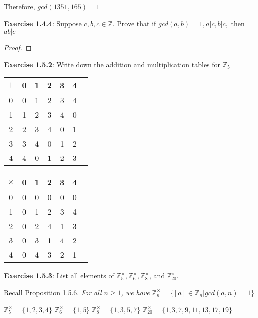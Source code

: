 \documentclass[a4paper]{article}
\begin{document}
\begin{myparindent}{0pt}
Therefore, $gcd(1351, 165) = 1$ \newline
\newline

\textbf{Exercise 1.4.4}:
Suppose $a, b, c \in \mathbb{Z}$. Prove that if $gcd(a, b) = 1, a|c, b|c,$ then $ab|c$
\begin{proof}
\end{proof}

\textbf{Exercise 1.5.2}:
Write down the addition and multiplication tables for $\mathbb{Z}_5$ \newline

\begin{center}
\begin{tabular}{ c| c | c | c | c | c | c |}
$+$ & 0 & 1 & 2 & 3 & 4 \\
\hline
0 & 0 & 1 & 2 & 3 & 4 \\
\hline
1 & 1 & 2 & 3 & 4 & 0 \\
\hline
2 & 2 & 3 & 4 & 0 & 1 \\
\hline
3 & 3 & 4 & 0 & 1 & 2 \\
\hline
4 & 4 & 0 & 1 & 2 & 3 \\
\hline
\end{tabular}
\end{center}

\begin{center}
\begin{tabular}{ c| c | c | c | c | c | c |}
$\times$ & 0 & 1 & 2 & 3 & 4 \\
\hline
0 & 0 & 0 & 0 & 0 & 0 \\
\hline
1 & 0 & 1 & 2 & 3 & 4 \\
\hline
2 & 0 & 2 & 4 & 1 & 3 \\
\hline
3 & 0 & 3 & 1 & 4 & 2 \\
\hline
4 & 0 & 4 & 3 & 2 & 1 \\
\hline
\end{tabular}
\end{center}

\textbf{Exercise 1.5.3}:
List all elements of $\mathbb{Z}_5^\times, \mathbb{Z}_6^\times, \mathbb{Z}_8^\times$, and $\mathbb{Z}_{20}^\times$.
\newline

Recall Proposition 1.5.6. \textit{For all $n \ge 1$, we have} $\mathbb{Z}_n^\times = \{ [a] \in \mathbb{Z}_n | gcd(a, n) = 1 \}$ \newline

$\mathbb{Z}_5^\times = \{ 1, 2, 3, 4 \}$ \newline
$\mathbb{Z}_6^\times = \{ 1, 5 \}$ \newline
$\mathbb{Z}_8^\times = \{ 1, 3, 5, 7 \}$ \newline
$\mathbb{Z}_{20}^\times = \{ 1, 3, 7, 9, 11, 13, 17, 19 \}$ \newline


\end{myparindent}
\end{document}

